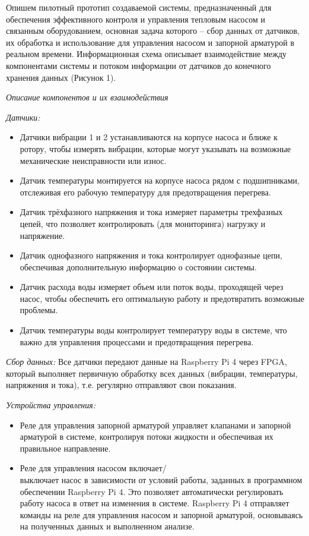 \begin{multicols}{2}

Опишем пилотный прототип создаваемой системы, предназначенный для
обеспечения эффективного контроля и управления тепловым насосом и
связанным оборудованием, основная задача которого -- сбор данных от
датчиков, их обработка и использование для управления насосом и запорной
арматурой в реальном времени. Информационная схема описывает
взаимодействие между компонентами системы и потоком информации от
датчиков до конечного хранения данных (Рисунок 1).

\emph{Описание компонентов и их взаимодействия}

\emph{Датчики:}

\begin{itemize}
  \setlength{\itemindent}{1cm}

\item
  Датчики вибрации 1 и 2 устанавливаются на корпусе насоса и ближе к
  ротору, чтобы измерять вибрации, которые могут указывать на возможные
  механические неисправности или износ.
\item
  Датчик температуры монтируется на корпусе насоса рядом с подшипниками,
  отслеживая его рабочую температуру для предотвращения перегрева.
\item
  Датчик трёхфазного напряжения и тока измеряет параметры трехфазных
  цепей, что позволяет контролировать (для мониторинга) нагрузку и
  напряжение.
\item
  Датчик однофазного напряжения и тока контролирует однофазные цепи,
  обеспечивая дополнительную информацию о состоянии системы.
\item
  Датчик расхода воды измеряет объем или поток воды, проходящей через
  насос, чтобы обеспечить его оптимальную работу и предотвратить
  возможные проблемы.
\item
  Датчик температуры воды контролирует температуру воды в системе, что
  важно для управления процессами и предотвращения перегрева.
\end{itemize}

\emph{Сбор данных:} Все датчики передают данные на Raspberry Pi 4 через
FPGA, который выполняет первичную обработку всех данных (вибрации,
температуры, напряжения и тока), т.е. регулярно отправляют свои
показания.

\emph{Устройства управления:}

\begin{itemize}
  \setlength{\itemindent}{1cm}

\item
  Реле для управления запорной арматурой управляет клапанами и запорной
  арматурой в системе, контролируя потоки жидкости и обеспечивая их
  правильное направление.
\item
  Реле для управления насосом включает/\\выключает насос в зависимости от
  условий работы, заданных в программном обеспечении Raspberry Pi 4. Это
  позволяет автоматически регулировать работу насоса в ответ на
  изменения в системе. Raspberry Pi 4 отправляет команды на реле для
  управления насосом и запорной арматурой, основываясь на полученных
  данных и выполненном анализе.
\end{itemize}


\end{multicols}
